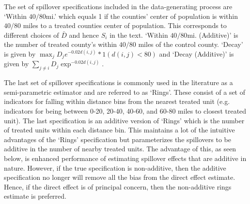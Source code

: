 \documentclass[11pt]{article}
\begin{document}
The set of spillover specifications included in the data-generating process are `Within $40/80$mi.' which equals 1 if the counties' center of population is within $40/80$ miles to a treated counties center of population. This corresponds to different choices of $\bar{D}$ and hence $S_i$ in the text. `Within $40/80$mi. (Additive)' is the number of treated county's within $40/80$ miles of the control county. `Decay' is given by $\max_j D_j e^{-0.02 d(i,j)} * 1(d(i,j) < 80)$ and `Decay (Additive)' is given by $\sum_{j \neq i} D_j \exp^{-0.02 d(i,j)}$.

The last set of spillover specifications is commonly used in the literature as a semi-parametric estimator and are referred to as `Rings'. These consist of a set of indicators for falling within distance bins from the nearest treated unit (e.g. indicators for being between 0-20, 20-40, 40-60, and 60-80 miles to closest treated unit). The last specification is an additive version of `Rings' which is the number of treated units within each distance bin. This maintains a lot of the intuitive advantages of the `Rings' specification but parameterizes the spillovers to be additive in the number of nearby treated units. The advantage of this, as seen below, is enhanced performance of estimating spillover effects that are additive in nature. However, if the true specification is non-additive, then the additive specification no longer will remove all the bias from the direct effect estimate. Hence, if the direct effect is of principal concern, then the non-additive rings estimate is preferred.
\end{document}
